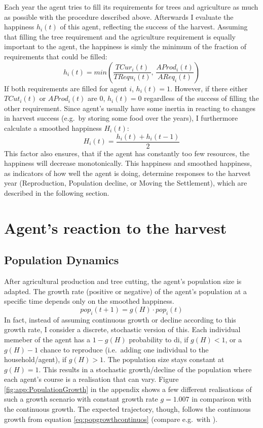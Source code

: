 Each year the agent tries to fill its requirements for trees and agriculture as much as possible with the procedure described above. 
Afterwards I evaluate the happiness $h_i(t)$ of this agent, reflecting the success of the harvest.
Assuming that filling the tree requirement and the agriculture requirement is equally important to the agent, the happiness is simly the minimum of the fraction of requirements that could be filled:
\begin{equation} 
h_i(t) = min \left( \frac{TCur_{i}(t)}{TRequ_i(t)}, \, \frac{AProd_i(t)}{AReq_i(t)} \right)
\label{eq:h_i}
\end{equation}
If both requirements are filled for agent $i$, $h_i(t)=1$.
However, if there either $TCut_i(t)$ or $AProd_i(t)$ are $0$, $h_i(t)=0$ regardless of the success of filling the other requirement.
Since agent's usually have some inertia in reacting to changes in harvest success (e.g.\ by storing some food over the years), I furthermore calculate a smoothed happiness $H_i(t)$:
\begin{equation}
H_i(t) = \frac{h_i(t) + h_i(t-1)}{2}
\end{equation}
This factor also ensures, that if the agent has constantly too few resources, the happiness will decrease monotonically.
This happiness and smoothed happiness, as indicators of how well the agent is doing, determine responses to the harvest year (Reproduction, Population decline, or Moving the Settlement), which are described in the following section.


\section{Agent's reaction to the harvest}\label{sec:Reaction} 
\subsection{Population Dynamics}


After agricultural production and tree cutting, the agent's population size is adapted. 
The growth rate (positive or negative) of the agent's population at a specific time depends only on the smoothed happiness. 
\begin{equation}\label{eq:popgrowthcontinuos}
pop_i(t+1) = g(H) \cdot pop_i(t)
\end{equation}
In fact, instead of assuming continuous growth or decline according to this growth rate, I consider a discrete, stochastic version of this.
Each individual memeber of the agent has a $1-g(H)$ probability to di, if $g(H)<1$, or a $g(H)-1$ chance to reproduce (i.e.\ adding one individual to the household/agent), if $g(H)>1$.
The population size stays constant at $g(H)=1$. 
This results in a stochastic growth/decline of the population where each agent's course is a realisation that can vary. 
Figure \ref{fig:app:PopulationGrowth} \TODO in the appendix shows a few different realisations of such a growth scenario with constant growth rate $g=1.007$ in comparison with the continuous growth.
The expected trajectory, though, follows the continuous growth from equation \ref{eq:popgrowthcontinuos} (compare e.g.\ with \cite{Bungartz2013}).

